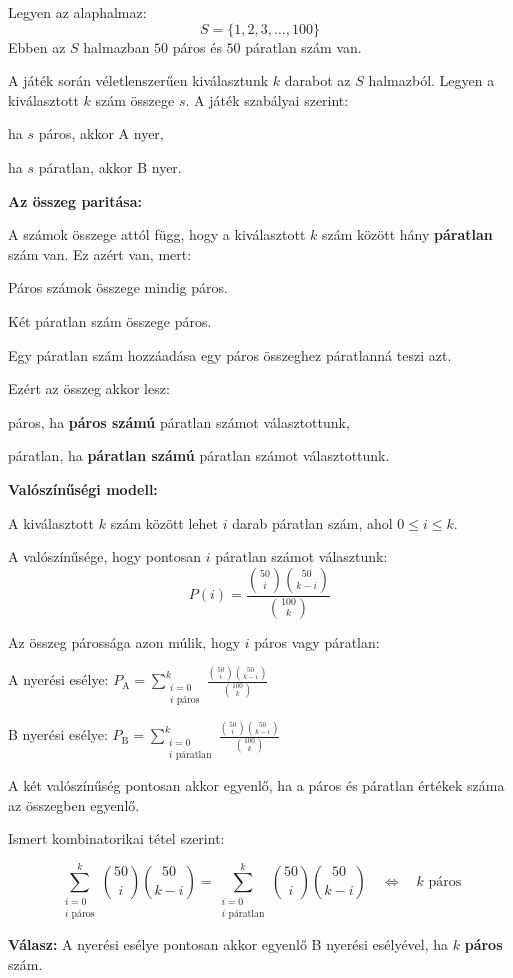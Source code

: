 \begin{solution}
Legyen az alaphalmaz: 
\[
S=\{1,2,3,\dots,100\}
\]
Ebben az $S$ halmazban $50$ páros és $50$ páratlan szám van.

A játék során véletlenszerűen kiválasztunk $k$ darabot az $S$ halmazból.
Legyen a kiválasztott $k$ szám összege $s$. A játék szabályai szerint:

ha $s$ páros, akkor A nyer,

ha $s$ páratlan, akkor B nyer.

\textbf{Az összeg paritása:}

A számok összege attól függ, hogy a kiválasztott $k$ szám között
hány \textbf{páratlan} szám van. Ez azért van, mert:

Páros számok összege mindig páros.

Két páratlan szám összege páros.

Egy páratlan szám hozzáadása egy páros összeghez páratlanná teszi
azt.

Ezért az összeg akkor lesz:

páros, ha \textbf{páros számú} páratlan számot választottunk,

páratlan, ha \textbf{páratlan számú} páratlan számot választottunk.

\textbf{Valószínűségi modell:}

A kiválasztott $k$ szám között lehet $i$ darab páratlan szám, ahol
$0\leq i\leq k$.

A valószínűsége, hogy pontosan $i$ páratlan számot választunk: 
\[
P(i)=\frac{\binom{50}{i}\binom{50}{k-i}}{\binom{100}{k}}
\]

Az összeg párossága azon múlik, hogy $i$ páros vagy páratlan:

A nyerési esélye: $P_{\text{A}}=\sum_{\substack{i=0\\
i\text{ páros}
}
}^{k}\frac{\binom{50}{i}\binom{50}{k-i}}{\binom{100}{k}}$

B nyerési esélye: $P_{\text{B}}=\sum_{\substack{i=0\\
i\text{ páratlan}
}
}^{k}\frac{\binom{50}{i}\binom{50}{k-i}}{\binom{100}{k}}$

A két valószínűség pontosan akkor egyenlő, ha a páros és páratlan
értékek száma az összegben egyenlő.

Ismert kombinatorikai tétel szerint:

\[
\sum_{\substack{i=0\\
i\text{ páros}
}
}^{k}\binom{50}{i}\binom{50}{k-i}=\sum_{\substack{i=0\\
i\text{ páratlan}
}
}^{k}\binom{50}{i}\binom{50}{k-i}\quad\Longleftrightarrow\quad k\text{ páros}
\]

\textbf{Válasz:} A nyerési esélye pontosan akkor egyenlő B nyerési
esélyével, ha $k$ \textbf{páros} szám.

\end{solution}

